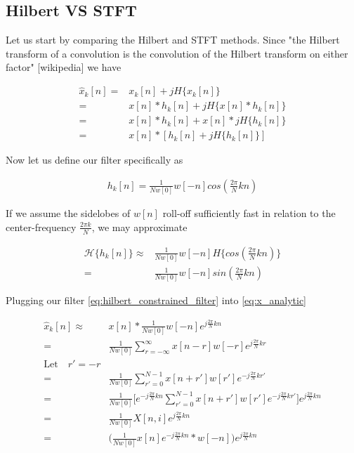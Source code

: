 \documentclass [11pt, proquest] {uwthesis}[2015/03/03]
\begin{document}
\subsection{Hilbert VS STFT}

Let us start by comparing the Hilbert and STFT methods.  Since "the Hilbert transform of a convolution is the convolution of the Hilbert transform on either factor" [wikipedia] we have 

\begin{align}
\label{eq:x_analytic}
\widehat{x}_k[n] =& x_k[n] + jH\{x_k[n]\} \nonumber \\
=& x[n] * h_k[n] + jH\{x[n] * h_k[n]\} \nonumber \\
=& x[n] * h_k[n] + x[n] * jH\{h_k[n]\} \nonumber \\
=& x[n] * [h_k[n]+  jH\{h_k[n]\}]
\end{align}

Now let us define our filter specifically as

\begin{align}
\label{eq:hilbert_constrained_filter}
h_k[n] = \frac{1}{Nw[0]}w[-n]cos(\frac{2\pi}{N}kn)
\end{align}

If we assume the sidelobes of $w[n]$ roll-off sufficiently fast in relation to the center-frequency $\frac{2\pi k}{N}$, we may approximate

\begin{align}
\mathcal{H}\{h_k[n]\} \approx& \frac{1}{Nw[0]}w[-n] H\{cos(\frac{2\pi}{N}kn)\} \nonumber \\
=& \frac{1}{Nw[0]}w[-n]sin(\frac{2\pi}{N}kn)
\end{align}


Plugging our filter \ref{eq:hilbert_constrained_filter} into \ref{eq:x_analytic}

\begin{align}
\widehat{x}_k[n] \approx& x[n] * \frac{1}{Nw[0]}w[-n]e^{j\frac{2\pi}{N}kn} \nonumber \\
=& \frac{1}{Nw[0]}\sum\limits_{r=-\infty}^{\infty}x[n - r] w[-r] e^{j\frac{2\pi}{N}kr} \nonumber \\
\textrm{Let} \quad r' = -r \nonumber \\
=& \frac{1}{Nw[0]}\sum\limits_{r'=0}^{N-1} x[n + r'] w[r'] e^{-j\frac{2\pi}{N}kr'} \nonumber \\
=& \frac{1}{Nw[0]}\bigg[e^{-j\frac{2\pi}{N}kn} \sum\limits_{r'=0}^{N-1} x[n + r'] w[r'] e^{-j\frac{2\pi}{N}kr'}\bigg]e^{j\frac{2\pi}{N}kn} \nonumber \\
=& \frac{1}{Nw[0]}X[n,i]e^{j\frac{2\pi}{N}kn} \nonumber \\
=& \Bigg( \frac{1}{Nw[0]}  x[n] e^{-j\frac{2\pi}{N}kn} * w[-n] \Bigg) e^{j\frac{2\pi}{N}kn} \\
\end{align}
\end{document}
